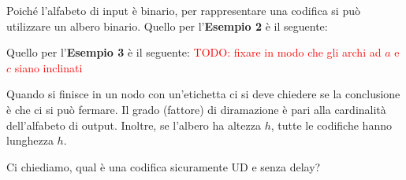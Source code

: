 Poiché l'alfabeto di input è binario, per rappresentare una codifica si può utilizzare un albero binario. Quello per l'\textbf{Esempio 2} è il seguente:
\begin{center}
\end{center}
Quello per l'\textbf{Esempio 3} è il seguente: \textcolor{Red}{TODO: fixare in modo che gli archi ad $a$ e $c$ siano inclinati}
\begin{center}
\end{center}
Quando si finisce in un nodo con un'etichetta ci si deve chiedere se la conclusione è che ci si può fermare. Il grado (fattore) di diramazione è pari alla cardinalità dell'alfabeto di output. Inoltre, se l'albero ha altezza $h$, tutte le codifiche hanno lunghezza $h$.

Ci chiediamo, qual è una codifica sicuramente UD e senza delay?

